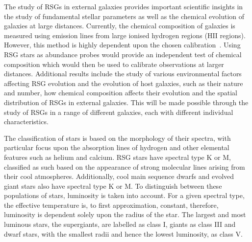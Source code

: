 

The study of RSGs in external galaxies provides important scientific insights in the study of fundamental stellar parameters as well as the chemical evolution of galaxies at large distances.
Currently, the chemical composition of galaxies is measured using emission lines from large ionised hydrogen regions (HII regions).
However, this method is highly dependent upon the chosen calibration~\citep[e.g.][]{Kudritzki10}.
Using RSG stars as abundance probes would provide an independent test of chemical composition which would then be used to calibrate observations at larger distances.
Additional results include the study of various environmental factors affecting RSG evolution and the evolution of host galaxies, such as their nature and number, how chemical composition affects their evolution and the spatial distribution of RSGs in external galaxies.
This will be made possible through the study of RSGs in a range of different galaxies, each with different individual characteristics.


The classification of stars is based on the morphology of their spectra, with particular focus upon the absorption lines of hydrogen and other elemental features such as helium and calcium.
RSG stars have spectral type K or M, classified as such based on the appearance of strong molecular lines arising from their cool atmospheres.
Additionally, cool main sequence dwarfs and evolved giant stars also have spectral type K or M.
To distinguish between these populations of stars, luminosity is taken into account.
For a given spectral type, the effective temperature is, to first approximation, constant, therefore, luminosity is dependent solely upon the radius of the star.
The largest and most luminous stars, the supergiants, are labelled as class I, giants as class III and dwarf stars, with the smallest radii and hence the lowest luminosity, as class V.


